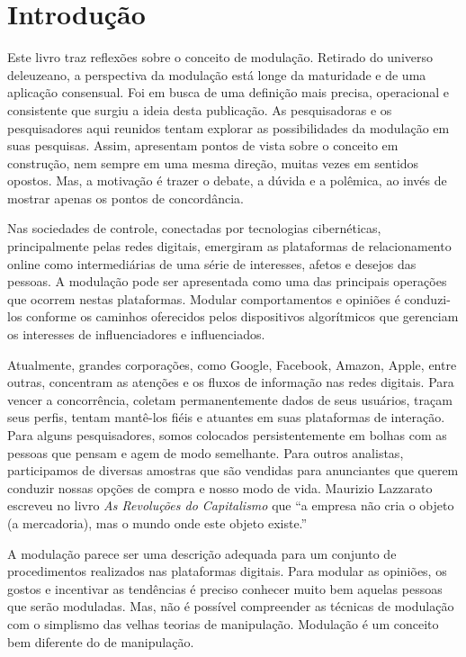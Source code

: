 \chapter{Introdução}

Este livro traz reflexões sobre o conceito de modulação. Retirado do
universo deleuzeano, a perspectiva da modulação está longe da maturidade
e de uma aplicação consensual. Foi em busca de uma definição mais
precisa, operacional e consistente que surgiu a ideia desta publicação.
As pesquisadoras e os pesquisadores aqui reunidos tentam explorar as
possibilidades da modulação em suas pesquisas. Assim, apresentam pontos
de vista sobre o conceito em construção, nem sempre em uma mesma
direção, muitas vezes em sentidos opostos. Mas, a motivação é trazer o
debate, a dúvida e a polêmica, ao invés de mostrar apenas os pontos de
concordância.

Nas sociedades de controle, conectadas por tecnologias cibernéticas,
principalmente pelas redes digitais, emergiram as plataformas de
relacionamento online como intermediárias de uma série de interesses,
afetos e desejos das pessoas. A modulação pode ser apresentada como uma
das principais operações que ocorrem nestas plataformas. Modular
comportamentos e opiniões é conduzi-los conforme os caminhos oferecidos
pelos dispositivos algorítmicos que gerenciam os interesses de
influenciadores e influenciados.

Atualmente, grandes corporações, como Google, Facebook, Amazon,
Apple, entre outras, concentram as atenções e os fluxos de informação
nas redes digitais. Para vencer a concorrência, coletam permanentemente
dados de seus usuários, traçam seus perfis, tentam mantê-los fiéis e
atuantes em suas plataformas de interação. Para alguns pesquisadores,
somos colocados persistentemente em bolhas com as pessoas que
pensam e agem de modo semelhante. Para outros analistas, participamos de
diversas amostras que são vendidas para anunciantes que querem conduzir
nossas opções de compra e nosso modo de vida. Maurizio Lazzarato
escreveu no livro \emph{As Revoluções do Capitalismo} que ``a
empresa não cria o objeto (a mercadoria), mas o mundo onde este objeto existe.''

A modulação parece ser uma descrição adequada para um conjunto de
procedimentos realizados nas plataformas digitais. Para modular as
opiniões, os gostos e incentivar as tendências é preciso conhecer muito bem
aquelas pessoas que serão moduladas. Mas, não é possível compreender as
técnicas de modulação com o simplismo das velhas teorias de manipulação.
Modulação é um conceito bem diferente do de manipulação.

